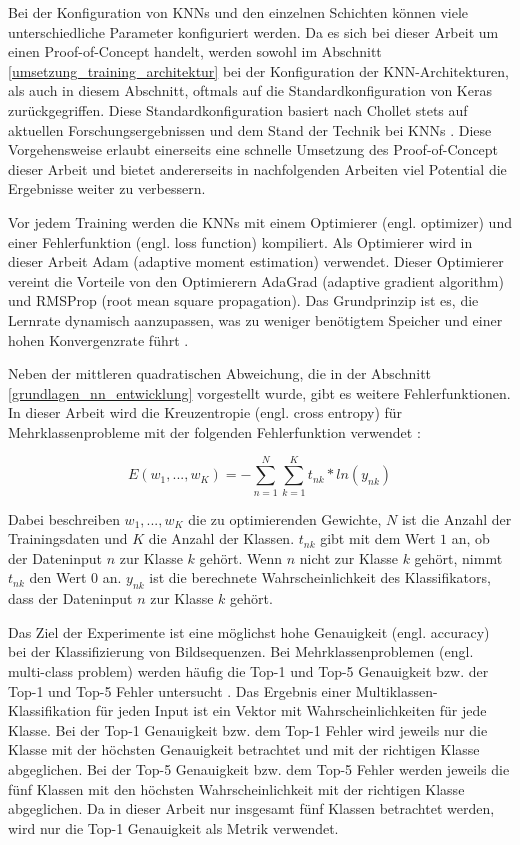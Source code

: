 Bei der Konfiguration von \acp{KNN} und den einzelnen Schichten können viele unterschiedliche Parameter konfiguriert werden. Da es sich bei dieser Arbeit um einen Proof-of-Concept handelt, werden sowohl im Abschnitt \ref{umsetzung_training_architektur} bei der Konfiguration der \ac{KNN}-Architekturen, als auch in diesem Abschnitt, oftmals auf die Standardkonfiguration von Keras zurückgegriffen. Diese Standardkonfiguration basiert nach Chollet stets auf aktuellen Forschungsergebnissen und dem Stand der Technik bei \acp{KNN} \cite{chollet2015keras}. Diese Vorgehensweise erlaubt einerseits eine schnelle Umsetzung des Proof-of-Concept dieser Arbeit und bietet andererseits in nachfolgenden Arbeiten viel Potential die Ergebnisse weiter zu verbessern.

Vor jedem Training werden die \acp{KNN} mit einem Optimierer (engl. optimizer) und einer Fehlerfunktion (engl. loss function) kompiliert. Als Optimierer wird in dieser Arbeit Adam (adaptive moment estimation) verwendet. Dieser Optimierer vereint die Vorteile von den Optimierern AdaGrad (adaptive gradient algorithm) und RMSProp (root mean square propagation). Das Grundprinzip ist es, die Lernrate dynamisch aanzupassen, was zu weniger benötigtem Speicher und einer hohen Konvergenzrate führt \cite{kingma2014adam}.

 Neben der mittleren quadratischen Abweichung, die in der Abschnitt \ref{grundlagen_nn_entwicklung} vorgestellt wurde, gibt es weitere Fehlerfunktionen. In dieser Arbeit wird die Kreuzentropie (engl. cross entropy) für Mehrklassenprobleme mit der folgenden Fehlerfunktion verwendet \cite{bishop2006pattern}:

\begin{equation}
E(w_1, ..., w_K) = -\sum _{n=1}^N \sum _{k=1}^K t_{nk} * ln(y_{nk})
\end{equation}

Dabei beschreiben $w_1, ..., w_K$ die zu optimierenden Gewichte, $N$ ist die Anzahl der Trainingsdaten und $K$ die Anzahl der Klassen. $t_{nk}$ gibt mit dem Wert $1$ an, ob der Dateninput $n$ zur Klasse $k$ gehört. Wenn $n$ nicht zur Klasse $k$ gehört, nimmt $t_{nk}$ den Wert $0$ an. $y_{nk}$ ist die berechnete Wahrscheinlichkeit des Klassifikators, dass der Dateninput $n$ zur Klasse $k$ gehört.

Das Ziel der Experimente ist eine möglichst hohe Genauigkeit (engl. accuracy) bei der Klassifizierung von Bildsequenzen. Bei Mehrklassenproblemen (engl. multi-class problem) werden häufig die Top-1 und Top-5 Genauigkeit bzw. der Top-1 und Top-5 Fehler untersucht \cite{szegedy2016inception, simonyan2014vgg, chollet2017xception}. Das Ergebnis einer Multiklassen-Klassifikation für jeden Input ist ein Vektor mit Wahrscheinlichkeiten für jede Klasse. Bei der Top-1 Genauigkeit bzw. dem Top-1 Fehler wird jeweils nur die Klasse mit der höchsten Genauigkeit betrachtet und mit der richtigen Klasse abgeglichen. Bei der Top-5 Genauigkeit bzw. dem Top-5 Fehler werden jeweils die fünf Klassen mit den höchsten Wahrscheinlichkeit mit der richtigen Klasse abgeglichen. Da in dieser Arbeit nur insgesamt fünf Klassen betrachtet werden, wird nur die Top-1 Genauigkeit als Metrik verwendet.

